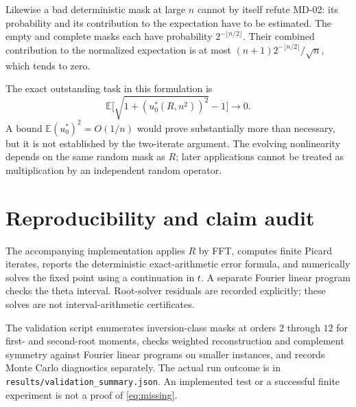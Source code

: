 \documentclass[11pt]{article}
\theoremstyle{remark}\newtheorem{remark}[theorem]{Remark}
\newcommand{\E}{\mathbb E}
\begin{document}
Likewise a bad deterministic mask at large $n$ cannot by itself refute
MD-02: its probability and its contribution to the expectation have to be
estimated. The empty and complete masks each have probability
$2^{-\lfloor n/2\rfloor}$. Their combined contribution to the normalized
expectation is at most $(n+1)2^{-\lfloor n/2\rfloor}/\sqrt n$, which tends
to zero.

The exact outstanding task in this formulation is
\begin{equation}\label{eq:missing}
 \E\bigl[\sqrt{1+(u^*_0(R,n^2))^2}-1\bigr]\longrightarrow0.
\end{equation}
A bound $\E(u^*_0)^2=O(1/n)$ would prove substantially more than necessary,
but it is not established by the two-iterate argument. The evolving
nonlinearity depends on the same random mask as $R$; later applications
cannot be treated as multiplication by an independent random operator.

\section{Reproducibility and claim audit}
The accompanying implementation applies $R$ by FFT, computes finite Picard
iterates, reports the deterministic exact-arithmetic error formula, and
numerically solves the fixed point using a continuation in $t$. A separate
Fourier linear program checks the theta interval. Root-solver residuals are
recorded explicitly; these solves are not interval-arithmetic certificates.

The validation script enumerates inversion-class masks at orders $2$ through
$12$ for first- and second-root moments, checks weighted reconstruction and
complement symmetry against Fourier linear programs on smaller instances,
and records Monte Carlo diagnostics separately. The actual run outcome is
in \texttt{results/validation\_summary.json}. An implemented test or a
successful finite experiment is not a proof of \eqref{eq:missing}.
\end{document}
